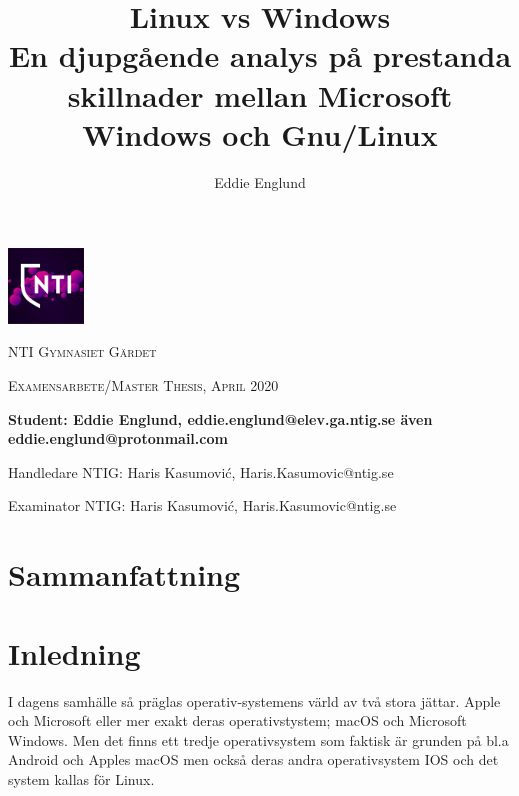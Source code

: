 \documentclass[a4paper, 12pt]{report}
\author{Eddie Englund}
\title{Linux vs Windows\\[0.2em]\smaller{}En djupgående analys på prestanda skillnader mellan Microsoft Windows och Gnu/Linux}
\begin{document}
\begin{titlepage}

    \maketitle

    \begin{center}

    
        \includegraphics[width=0.15\textwidth]{nti}\par\vspace{1cm}

    {\scshape\LARGE NTI Gymnasiet Gärdet \par}
    \vspace{1cm}
    {\scshape\Large Examensarbete/Master Thesis, April 2020\par}
	\vspace{1.5cm}
    \textbf{
    Student: Eddie Englund, eddie.englund@elev.ga.ntig.se även eddie.englund@protonmail.com}
    \vspace{0.2cm}

    Handledare NTIG: Haris Kasumović, Haris.Kasumovic@ntig.se
    \vspace{0.1cm}

    Examinator NTIG: Haris Kasumović, Haris.Kasumovic@ntig.se
    
    \end{center}
\end{titlepage}


\section{Sammanfattning}\label{sum}

    \begin{abstract}

    \end{abstract}

\tableofcontents



\section{Inledning}


    I dagens samhälle så präglas operativ-systemens värld av två stora jättar. Apple och Microsoft eller mer exakt deras operativstystem; macOS och Microsoft Windows. Men det finns ett tredje operativsystem som faktisk är grunden på bl.a Android och Apples macOS men också deras andra operativsystem IOS och det system kallas för Linux.
\end{document}
